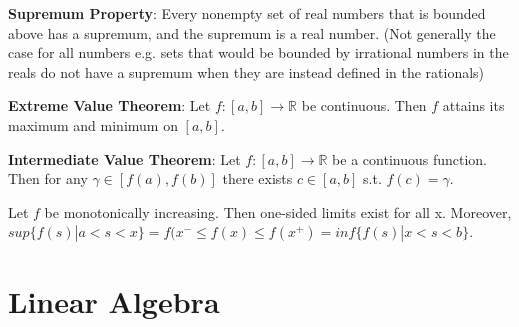 \documentclass[11pt]{article} %
\begin{document}
\textbf{Supremum Property}: Every nonempty set of real numbers that is bounded above has a supremum, and the supremum is a real number. (Not generally the case for all numbers e.g. sets that would be bounded by irrational numbers in the reals do not have a supremum when they are instead defined in the rationals)

\textbf{Extreme Value Theorem}: Let $f:[a,b]\rightarrow \mathbb{R}$ be continuous. Then $f$ attains its maximum and minimum on $[a,b]$.

\textbf{Intermediate Value Theorem}: Let $f:[a,b]\rightarrow \mathbb{R}$ be a continuous function. Then for any $\gamma \in [f(a),f(b)]$ there exists $c \in [a,b]$ s.t. $f(c) = \gamma$.

Let $f$ be monotonically increasing. Then one-sided limits exist for all x. Moreover, $sup\{f(s)|a<s<x\} = f(x^{-} \leq f(x) \leq f(x^{+}) = inf\{ f(s)|x<s<b\}$.

\section{Linear Algebra}
\end{document}
